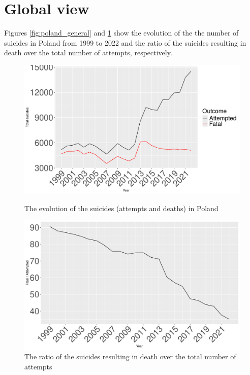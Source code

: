 \documentclass{article}
\begin{document}
\section{Global view}
Figures \ref{fig:poland_general} and \ref{fig:poland_foa} show the evolution of the the 
number of suicides in Poland from 1999 to 2022 and the ratio of the suicides resulting
in death over the total number of attempts, respectively.
\begin{figure}[H]
	\centering
	\begin{minipage}{0.45\textwidth}
		\includegraphics[width=\textwidth]{imgs/poland_general.pdf}
		\caption{The evolution of the suicides (attempts and deaths) in Poland}
		\label{fig:poland_general}
	\end{minipage}
	\hfill
	\begin{minipage}{0.45\textwidth}
		\includegraphics[width=\textwidth]{imgs/poland_foa.pdf}
		\caption{The ratio of the suicides resulting in death over the total number of attempts}
		\label{fig:poland_foa}
	\end{minipage}
\end{figure}
\end{document}
